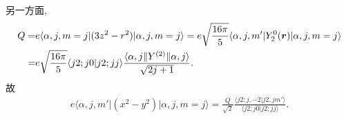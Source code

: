 \documentclass{assignment}
\begin{document}
\begin{sol}
\begin{itemize}
        另一方面,
        \begin{align}
            \notag Q=&e\langle\alpha,j,m=j\rvert(3z^2-r^2)\lvert\alpha,j,m=j\rangle=e\sqrt{\frac{16\pi}{5}}\langle\alpha,j,m'\rvert Y_2^0(\bm{r})\lvert\alpha,j,m=j\rangle\\
            =&e\sqrt{\frac{16\pi}{5}}\langle j2;j0\vert j2;jj\rangle\frac{\langle\alpha,j\rVert Y^{(2)}\lVert\alpha,j\rangle}{\sqrt{2j+1}}.
        \end{align}
        故
        \begin{align}
            e\langle\alpha,j,m'\rvert(x^2-y^2)\lvert\alpha,j,m=j\rangle=\frac{Q}{\sqrt{2}}\frac{\langle j2;j,-2\vert j2,jm'\rangle}{\langle j2;j0\vert j2;jj\rangle}.
        \end{align}
    \end{itemize}
\end{sol}
\end{document}
